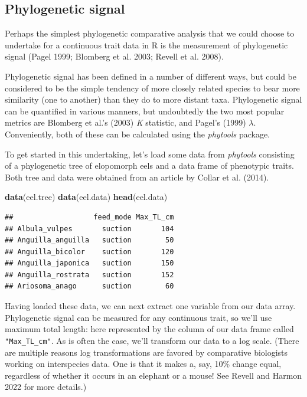 \documentclass[fleqn,10pt,lineno]{wlpeerj} %
\newenvironment{Shaded}{\begin{snugshade}}{\end{snugshade}}
\newcommand{\FunctionTok}[1]{\textcolor[rgb]{0.13,0.29,0.53}{\textbf{#1}}}
\newcommand{\NormalTok}[1]{#1}
\begin{document}
\hypertarget{phylogenetic-signal}{%
\subsection{Phylogenetic signal}\label{phylogenetic-signal}}

Perhaps the simplest phylogenetic comparative analysis that we could choose to undertake for a continuous trait data in R is the measurement of phylogenetic signal (Pagel 1999; Blomberg et al. 2003; Revell et al. 2008).

Phylogenetic signal has been defined in a number of different ways, but could be considered to be the simple tendency of more closely related species to bear more similarity (one to another) than they do to more distant taxa. Phylogenetic signal can be quantified in various manners, but undoubtedly the two most popular metrics are Blomberg et al.'s (2003) \emph{K} statistic, and Pagel's (1999) \(\lambda\). Conveniently, both of these can be calculated using the \emph{phytools} package.

To get started in this undertaking, let's load some data from \emph{phytools} consisting of a phylogenetic tree of elopomorph eels and a data frame of phenotypic traits. Both tree and data were obtained from an article by Collar et al. (2014).

\begin{Shaded}
\begin{Highlighting}[]
\FunctionTok{data}\NormalTok{(eel.tree)}
\FunctionTok{data}\NormalTok{(eel.data)}
\FunctionTok{head}\NormalTok{(eel.data)}
\end{Highlighting}
\end{Shaded}

\begin{verbatim}
##                   feed_mode Max_TL_cm
## Albula_vulpes       suction       104
## Anguilla_anguilla   suction        50
## Anguilla_bicolor    suction       120
## Anguilla_japonica   suction       150
## Anguilla_rostrata   suction       152
## Ariosoma_anago      suction        60
\end{verbatim}

Having loaded these data, we can next extract one variable from our data array. Phylogenetic signal can be measured for any continuous trait, so we'll use maximum total length: here represented by the column of our data frame called \texttt{"Max\_TL\_cm"}. As is often the case, we'll transform our data to a log scale. (There are multiple reasons log transformations are favored by comparative biologists working on interspecies data. One is that it makes a, say, 10\% change equal, regardless of whether it occurs in an elephant or a mouse! See Revell and Harmon 2022 for more details.)
\end{document}
